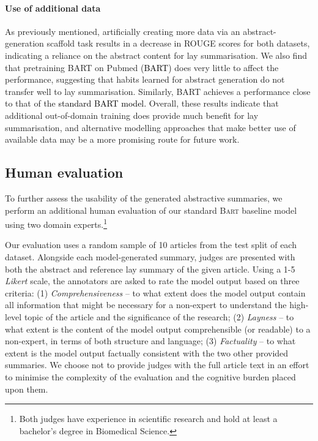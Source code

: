 \documentclass[11pt]{article}
\begin{document}
\paragraph{Use of additional data}
As previously mentioned, artificially creating more data via an abstract-generation scaffold task results in a decrease in ROUGE scores for both datasets, indicating a reliance on the abstract content for lay summarisation.  We also find that pretraining \textsc{BART} on Pubmed \textcolor{black}{(\textsc{BART})} does very little to affect the performance, suggesting that habits learned for abstract generation do not transfer well to lay summarisation.
Similarly, \textsc{BART} achieves a performance close to that of the 
\textcolor{black}{standard \textsc{BART} model.}
Overall, these results indicate that additional out-of-domain training does provide much benefit for lay summarisation, and alternative modelling approaches that make better use of available data may be a more promising route for future work. 

\subsection{Human evaluation} \label{subsec:results-human}
To further assess the usability of the generated abstractive summaries, we perform an additional human evaluation of our standard \textsc{Bart} baseline model using two domain experts.\footnote{Both judges have experience in scientific research and hold at least a bachelor's degree in Biomedical Science.} 

Our evaluation uses a random sample of 10 articles from the test split of each dataset. Alongside each model-generated summary, judges are presented with both the abstract and reference lay summary of the given article. Using a 1-5 \textit{Likert} scale, the annotators are asked to rate the model output based on three criteria:
(1) \textit{Comprehensiveness} -- to what extent does the model output contain all information that might be necessary for a non-expert to understand the high-level topic of the article and the significance of the research;
(2) \textit{Layness} -- to what extent is the content of the model output comprehensible (or readable) to a non-expert, in terms of both structure and language;
(3) \textit{Factuality} -- to what extent is the model output factually consistent with the two other provided summaries. 
We choose not to provide judges with the full article text in an effort to minimise the complexity of the evaluation and the cognitive burden placed upon them.
\end{document}
